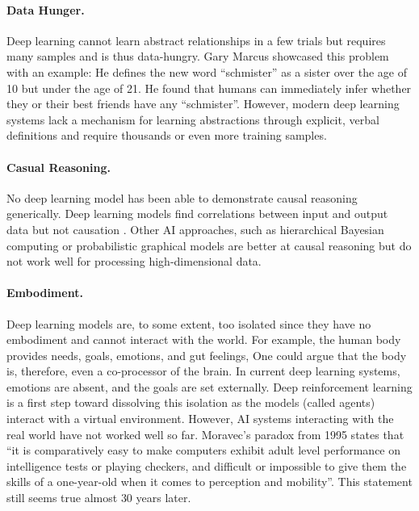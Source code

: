 \paragraph{Data Hunger.} Deep learning cannot learn abstract relationships in a few trials but requires many samples and is thus data-hungry.
Gary Marcus  showcased this problem with an example: He defines the new word ``schmister'' as a sister over the age of 10 but under the age of 21. He found that humans can immediately infer whether they or their best friends have any ``schmister''. However, modern deep learning systems lack a mechanism for learning abstractions through explicit, verbal definitions and require thousands or even more training samples.

\paragraph{Casual Reasoning.} No deep learning model has been able to demonstrate causal reasoning generically.
Deep learning models find correlations between input and output data but not causation \cite{prince_understanding_2023}.
Other AI approaches, such as hierarchical Bayesian computing \cite{allenby_hierarchical_2005} or probabilistic graphical models \cite{koller_probabilistic_2009} are better at causal reasoning but do not work well for processing high-dimensional data.

\paragraph{Embodiment.} Deep learning models are, to some extent, too isolated since they have no embodiment and cannot interact with the world.
For example, the human body provides needs, goals, emotions, and gut feelings, One could argue that the body is, therefore, even a co-processor of the brain.
In current deep learning systems, emotions are absent, and the goals are set externally.
Deep reinforcement learning \cite{dong_deep_2020} is a first step toward dissolving this isolation as the models (called agents) interact with a virtual environment. 
However, AI systems interacting with the real world have not worked well so far.
Moravec's paradox from 1995  states that ``it is comparatively easy to make computers exhibit adult level performance on intelligence tests or playing checkers, and difficult or impossible to give them the skills of a one-year-old when it comes to perception and mobility''.
This statement still seems true almost $30$ years later.



